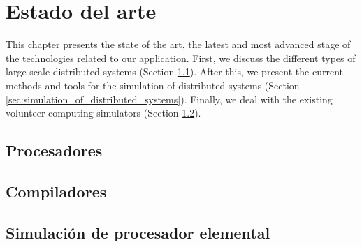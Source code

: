 \chead[]{}
\renewcommand{\headrulewidth}{0.5pt}

\lfoot[]{}
\cfoot[]{}
\rfoot[]{}
\renewcommand{\footrulewidth}{0pt}

\chapter{Estado del arte}
\label{ch:state_of_the_art}

This chapter presents the state of the art, the latest and most advanced stage of the technologies related to our application. First, we discuss the different types of large-scale distributed systems (Section \ref{sec:large_scale_distributed_systems}). After this, we present the  current methods and tools for the simulation of distributed systems (Section \ref{sec:simulation_of_distributed_systems}). Finally, we deal with the existing volunteer computing simulators (Section \ref{sec:related_work}).

\section{Procesadores}
\label{sec:large_scale_distributed_systems}


\section{Compiladores}
\label{sec:related_work}


\section{Simulación de procesador elemental}
\label{sec:Processor_simulator}

